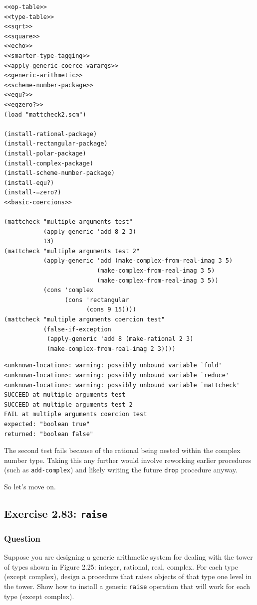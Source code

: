 \documentclass[final,fleqn,titlepage,twoside]{article}
\begin{document}
\begin{verbatim}
<<op-table>>
<<type-table>>
<<sqrt>>
<<square>>
<<echo>>
<<smarter-type-tagging>>
<<apply-generic-coerce-varargs>>
<<generic-arithmetic>>
<<scheme-number-package>>
<<equ?>>
<<eqzero?>>
(load "mattcheck2.scm")

(install-rational-package)
(install-rectangular-package)
(install-polar-package)
(install-complex-package)
(install-scheme-number-package)
(install-equ?)
(install-=zero?)
<<basic-coercions>>

(mattcheck "multiple arguments test"
           (apply-generic 'add 8 2 3)
           13)
(mattcheck "multiple arguments test 2"
           (apply-generic 'add (make-complex-from-real-imag 3 5)
                          (make-complex-from-real-imag 3 5)
                          (make-complex-from-real-imag 3 5))
           (cons 'complex
                 (cons 'rectangular
                       (cons 9 15))))
(mattcheck "multiple arguments coercion test"
           (false-if-exception
            (apply-generic 'add 8 (make-rational 2 3)
            (make-complex-from-real-imag 2 3))))
\end{verbatim}

\begin{verbatim}
<unknown-location>: warning: possibly unbound variable `fold'
<unknown-location>: warning: possibly unbound variable `reduce'
<unknown-location>: warning: possibly unbound variable `mattcheck'
SUCCEED at multiple arguments test
SUCCEED at multiple arguments test 2
FAIL at multiple arguments coercion test
expected: "boolean true"
returned: "boolean false"
\end{verbatim}

The second test fails because of the rational being nested within the complex
number type. Taking this any further would involve reworking earlier procedures
(such as \texttt{add-complex}) and likely writing the future \texttt{drop}
procedure anyway.

So let's move on.

\subsection{Exercise 2.83: \texttt{raise}}
\label{sec:org1509370}
\subsubsection{Question}
\label{sec:orgf10a524}
Suppose you are designing a generic arithmetic system for dealing with the tower
of types shown in Figure 2.25: integer, rational, real, complex. For each type
(except complex), design a procedure that raises objects of that type one level
in the tower. Show how to install a generic \texttt{raise} operation that
will work for each type (except complex).
\end{document}
